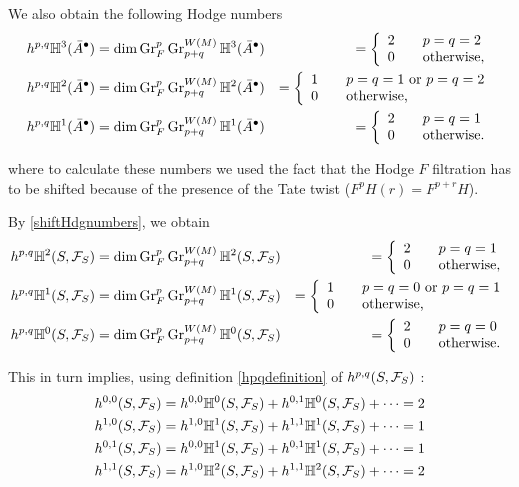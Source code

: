 \documentclass[../main.tex]{subfiles}
\begin{document}
We also obtain the following Hodge numbers
\begin{eqnarray*}
h^{p,q}\mathbb{H}^3(\bar A^\bullet)&=  \dim \operatorname{Gr}^p_F \operatorname{Gr}^{W(M)}_{p+q} \mathbb{H}^3(\bar A^\bullet)  &=
\left\{\begin{array}{ll} 2 &\quad p=q=2\\ 0&\quad\hbox{otherwise,}\end{array}\right.\\
h^{p,q}\mathbb{H}^2(\bar A^\bullet)&= \dim \operatorname{Gr}^p_F \operatorname{Gr}^{W(M)}_{p+q} \mathbb{H}^2(\bar A^\bullet)   &=
\left\{\begin{array}{ll} 1 &\quad p=q=1\hbox{ or }p=q=2\\ 0&\quad\hbox{otherwise,}\end{array}\right.\\
h^{p,q}\mathbb{H}^1(\bar A^\bullet)&= \dim \operatorname{Gr}^p_F \operatorname{Gr}^{W(M)}_{p+q} \mathbb{H}^1(\bar A^\bullet)  &=
\left\{\begin{array}{ll} 2 &\quad p=q=1\\ 0&\quad\hbox{otherwise.}\end{array}\right.
\end{eqnarray*}

where to calculate these numbers we used the fact that the Hodge $F$ filtration has to be shifted because of the presence of the Tate twist ($F^p H(r) = F^{p+r} H$).

By \eqref{shiftHdgnumbers}, we obtain
\begin{eqnarray*}
h^{p,q}\mathbb{H}^2(S, \mathcal{F}_S)&=  \dim \operatorname{Gr}^p_F \operatorname{Gr}^{W(M)}_{p+q} \mathbb{H}^2(S, \mathcal{F}_S)  &=
\left\{\begin{array}{ll} 2 &\quad p=q=1\\ 0&\quad\hbox{otherwise,}\end{array}\right.\\
h^{p,q}\mathbb{H}^1(S, \mathcal{F}_S)&= \dim \operatorname{Gr}^p_F \operatorname{Gr}^{W(M)}_{p+q} \mathbb{H}^1(S, \mathcal{F}_S)   &=
\left\{\begin{array}{ll} 1 &\quad p=q=0 \hbox{ or }p=q=1\\ 0&\quad\hbox{otherwise,}\end{array}\right.\\
h^{p,q}\mathbb{H}^0(S, \mathcal{F}_S)&= \dim \operatorname{Gr}^p_F \operatorname{Gr}^{W(M)}_{p+q} \mathbb{H}^0(S, \mathcal{F}_S)  &=
\left\{\begin{array}{ll} 2 &\quad p=q=0\\ 0&\quad\hbox{otherwise.}\end{array}\right.
\end{eqnarray*}

This in turn implies, using definition \eqref{hpqdefinition} of $h^{p,q}(S,\mathcal{F}_S)$ :
\begin{align*}
    h^{0,0}(S,\mathcal{F}_S)= h^{0,0}\mathbb{H}^0(S, \mathcal{F}_S) + h^{0,1}\mathbb{H}^0(S, \mathcal{F}_S) + \dots  = 2 \\
    h^{1,0}(S,\mathcal{F}_S)= h^{1,0}\mathbb{H}^1(S, \mathcal{F}_S) + h^{1,1}\mathbb{H}^1(S, \mathcal{F}_S) + \dots = 1 \\
     h^{0,1}(S,\mathcal{F}_S)= h^{0,0}\mathbb{H}^1(S, \mathcal{F}_S) + h^{0,1}\mathbb{H}^1(S, \mathcal{F}_S ) + \dots = 1 \\
     h^{1,1}(S,\mathcal{F}_S)= h^{1,0}\mathbb{H}^2(S, \mathcal{F}_S) + h^{1,1}\mathbb{H}^2(S, \mathcal{F}_S ) + \dots = 2 
\end{align*}
\end{document}
